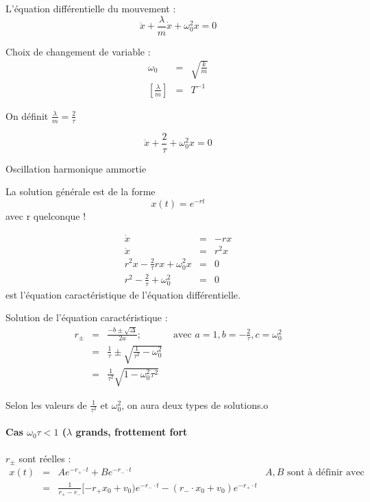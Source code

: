 	L'équation différentielle du mouvement : \[\ddot{x} + \frac{\lambda}{m} \dot{x} + \omega_0^2 x = 0\]

	Choix de changement de variable :
	\[\begin{array}{rcl}
			\omega_0 &=& \sqrt{\frac{k}{m}} \\
	{[\frac{\lambda}{m}]} &=& T^{-1}\end{array}\]

	On définit $\frac{\lambda}{m} = \frac{2}{\tau}$

	\[\ddot{x} + \frac{2}{\tau} + \omega_0^2 x = 0\]

	Oscillation harmonique ammortie

	La solution générale est de la forme \[x(t) = e^{-rt}\] avec r quelconque !

	\[\begin{array}{rcl}
			\dot{x} &=& -rx \\
			\ddot{x} &=& r^2 x \\
			r^2 x - \frac{2}{\tau} rx + \omega_0^2 x &=& 0\\
	r^2 - \frac{2}{\tau} + \omega_0^2 &=& 0\end{array}\] est l'équation caractéristique de l'équation différentielle.

	Solution de l'équation caractéristique :
	\[\begin{array}{rclr}
		r_{\pm} &=& \frac{-b \pm \sqrt{\Delta}}{2a}; &  \text{ avec } a=1, b=-\frac{2}{\tau}, c = \omega_0^2 \\
							   &=& \frac{1}{\tau} \pm  \sqrt{\frac{1}{\tau^2} - \omega_0^2} \\
			&=& \frac{1}{\tau^2} \sqrt{1 - \omega_0^2 \tau^2}\end{array}\]

	Selon les valeurs de $\frac{1}{\tau^2}$ et $\omega_0^2$, on aura deux types de solutions.o
	\paragraph{Cas $\omega_0 \tau < 1$ ($\lambda$ grands, frottement fort}

	$r_{\pm}$ sont réelles :
	\[\begin{array}{rccl}
			x(t) &=& Ae^{-r_+\cdot t} + Be^{-r_- \cdot t} & A, B\text{ sont à définir avec les conditions initiales }\\
			   &=& \frac{1}{r_+ - r_-} [-r_+ x_0 + v_0)e^{-r_- \cdot t} - (r_- \cdot x_0 + v_0)e^{-r_+ \cdot t}
	\end{array}\]

